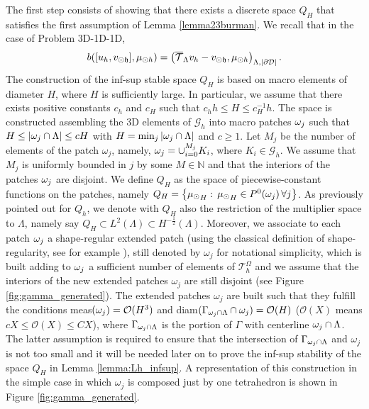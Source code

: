 \documentclass[r]{siamart171218}
\begin{document}
The first step consists of showing
that there exists a discrete space $Q_H$ that satisfies the first assumption of Lemma \ref{lemma23burman}. 
We recall that in the case of Problem 3D-1D-1D, 
\begin{equation*}
b([u_h, v_{\odot \mathfrak{h}}], \mu_{\odot h}) = \left({\overline{\mathcal{T}}_\Lambda} v_h - v_{\odot \mathfrak{h}}, \mu_{\odot h}\right)_{\Lambda,|\partial\mathcal{D}|}.
\end{equation*}
The construction of the inf-sup stable space $Q_H$ is based on macro elements of diameter $H$, where $H$ is sufficiently large. In particular, we assume that there exists positive constants $c_h$ and $c_H$ such that $c_h h\leq H \leq c_H^{-1}h$. The space is constructed assembling the 3D elements of $\mathcal{G}_h$ into macro patches $ \omega _j $ such that $H \leq |\omega _j\cap \Lambda|\leq cH$ with $H=\min_{j}|\omega _j\cap \Lambda|$ and $c\geq 1$. Let $M_j$ be the number of elements of the patch $\omega_j$, namely, $\omega _j=\cup _{i=0}^{M_j} K_i$, where $K_i \in \mathcal{G}_h$. We assume that $M_j$ is uniformly bounded in $j$ by some $M\in \mathbb{N}$ and that the interiors of the patches $\omega _j$ are  disjoint.
We define $Q_H$ as the space of piecewise-constant functions on the patches, namely
$Q_H=\left\{{\mu_{\odot} }_H: \, {\mu_{\odot} }_H\in P^0(\omega _j)\, \forall j \right\}$.
As previously pointed out for $Q_h$, we denote with $Q_H$ also the restriction of the multiplier space to $\Lambda$, namely say $Q_H \subset L^2(\Lambda) \subset H^{-\frac12}(\Lambda)$.
%
Moreover, we associate to each patch $\omega _j$ a shape-regular extended patch (using the classical definition of shape-regularity, see for example \cite{MR2050138}), still denoted by $\omega_j$ for notational simplicity, which is built adding to $\omega _j$ a sufficient number of elements of $\mathcal{T}_h^{\Omega}$ and we assume that the interiors of the new extended patches $\omega _j$ are still disjoint (see Figure \ref{fig:gamma_generated}). The extended patches $\omega _j$ are built such that they fulfill the conditions meas$(\omega _j)=\mathcal{O}(H^3)$ and diam$(\Gamma_{\omega _j\cap \Lambda}\cap \omega_j)=\mathcal{O}(H)$ ($\mathcal{O}(X)$ means $cX \leq \mathcal{O}(X) \leq CX$), where $\Gamma_{\omega _j\cap \Lambda}$ is the portion of $\Gamma$ with centerline $\omega _j\cap \Lambda$. The latter assumption is required to ensure that the intersection of $\Gamma_{\omega _j\cap \Lambda}$ and $\omega_j$ is not too small and it will be needed later on to prove the inf-sup stability of the space $Q_H$ in Lemma \ref{lemma:Lh_infsup}. A representation of this construction in the simple case in which $\omega _j$ is composed just by one tetrahedron is shown in Figure \ref{fig:gamma_generated}.
\end{document}
